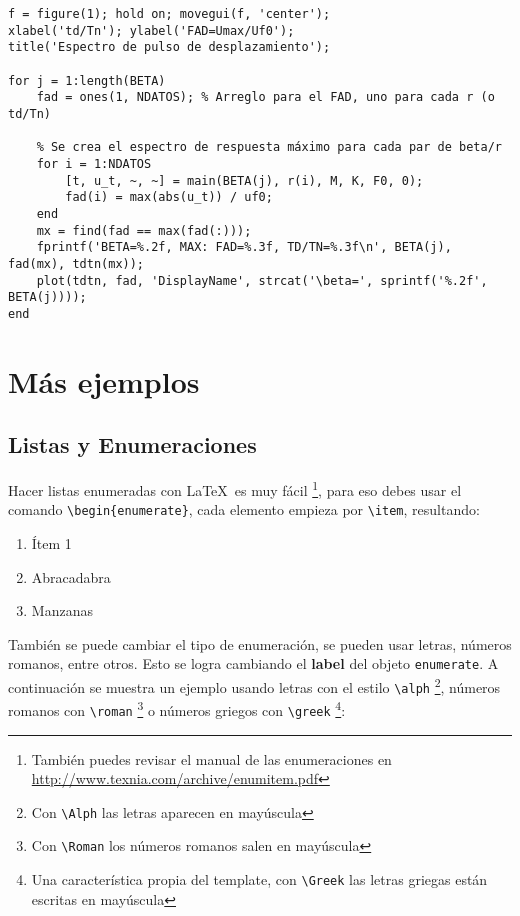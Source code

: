 \begin{lstlisting}[style=Matlab, caption={Ejemplo en Matlab.\label{codigo-matlab}}]
% Se crea gráfico
f = figure(1); hold on; movegui(f, 'center');
xlabel('td/Tn'); ylabel('FAD=Umax/Uf0');
title('Espectro de pulso de desplazamiento');

for j = 1:length(BETA)
	fad = ones(1, NDATOS); % Arreglo para el FAD, uno para cada r (o td/Tn)
	
	% Se crea el espectro de respuesta máximo para cada par de beta/r
	for i = 1:NDATOS
		[t, u_t, ~, ~] = main(BETA(j), r(i), M, K, F0, 0);
		fad(i) = max(abs(u_t)) / uf0;
	end
	mx = find(fad == max(fad(:)));
	fprintf('BETA=%.2f, MAX: FAD=%.3f, TD/TN=%.3f\n', BETA(j), fad(mx), tdtn(mx));
	plot(tdtn, fad, 'DisplayName', strcat('\beta=', sprintf('%.2f', BETA(j))));
end
\end{lstlisting}


\section{Más ejemplos}
	
	\subsection{Listas y Enumeraciones}
		
		Hacer listas enumeradas con \LaTeX\ es muy fácil \footnote{También puedes revisar el manual de las enumeraciones en \url{http://www.texnia.com/archive/enumitem.pdf}}, para eso debes usar el comando \texttt{\textbackslash begin\{enumerate\}}, cada elemento empieza por \texttt{\textbackslash item}, resultando:
		
		\begin{enumerate}
			\item Ítem 1
			\item Abracadabra
			\item Manzanas
		\end{enumerate}
		
		También se puede cambiar el tipo de enumeración, se pueden usar letras, números romanos, entre otros. Esto se logra cambiando el \textbf{label} del objeto \texttt{enumerate}. A continuación se muestra un ejemplo usando letras con el estilo \texttt{\textbackslash alph} \footnote{Con \texttt{\textbackslash Alph} las letras aparecen en mayúscula}, números romanos con \texttt{\textbackslash roman} \footnote{Con \texttt{\textbackslash Roman} los números romanos salen en mayúscula} o números griegos con \texttt{\textbackslash greek} \footnote{Una característica propia del template, con \texttt{\textbackslash Greek} las letras griegas están escritas en mayúscula}:
		

